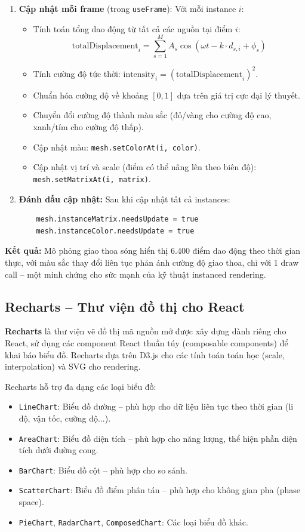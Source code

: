\begin{enumerate}
    \item \textbf{Cập nhật mỗi frame} (trong \texttt{useFrame}): Với mỗi instance $i$:
    \begin{itemize}
        \item Tính toán tổng dao động từ tất cả các nguồn tại điểm $i$:
        \[
            \text{totalDisplacement}_i = \sum_{s=1}^{M} A_s \cos(\omega t - k \cdot d_{s,i} + \phi_s)
        \]
        \item Tính cường độ tức thời: $\text{intensity}_i = (\text{totalDisplacement}_i)^2$.
        \item Chuẩn hóa cường độ về khoảng $[0, 1]$ dựa trên giá trị cực đại lý thuyết.
        \item Chuyển đổi cường độ thành màu sắc (đỏ/vàng cho cường độ cao, xanh/tím cho cường độ thấp).
        \item Cập nhật màu: \texttt{mesh.setColorAt(i, color)}.
        \item Cập nhật vị trí và scale (điểm có thể nâng lên theo biên độ): \texttt{mesh.setMatrixAt(i, matrix)}.
    \end{itemize}
    \item \textbf{Đánh dấu cập nhật:} Sau khi cập nhật tất cả instances:
    \begin{verbatim}
    mesh.instanceMatrix.needsUpdate = true
    mesh.instanceColor.needsUpdate = true
    \end{verbatim}
\end{enumerate}

\textbf{Kết quả:} Mô phỏng giao thoa sóng hiển thị 6.400 điểm dao động theo thời gian thực, với màu sắc thay đổi liên tục phản ánh cường độ giao thoa, chỉ với 1 draw call – một minh chứng cho sức mạnh của kỹ thuật instanced rendering.

\subsection{Recharts – Thư viện đồ thị cho React}

\textbf{Recharts} là thư viện vẽ đồ thị mã nguồn mở được xây dựng dành riêng cho React, sử dụng các component React thuần túy (composable components) để khai báo biểu đồ. Recharts dựa trên D3.js cho các tính toán toán học (scale, interpolation) và SVG cho rendering.

Recharts hỗ trợ đa dạng các loại biểu đồ:
\begin{itemize}
    \item \texttt{LineChart}: Biểu đồ đường – phù hợp cho dữ liệu liên tục theo thời gian (li độ, vận tốc, cường độ...).
    \item \texttt{AreaChart}: Biểu đồ diện tích – phù hợp cho năng lượng, thể hiện phần diện tích dưới đường cong.
    \item \texttt{BarChart}: Biểu đồ cột – phù hợp cho so sánh.
    \item \texttt{ScatterChart}: Biểu đồ điểm phân tán – phù hợp cho không gian pha (phase space).
    \item \texttt{PieChart}, \texttt{RadarChart}, \texttt{ComposedChart}: Các loại biểu đồ khác.
\end{itemize}

